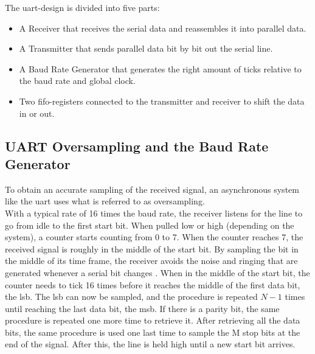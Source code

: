\documentclass[main.tex]{subfiles}
\begin{document}
The \gls{uart}-design is divided into five parts:
\begin{itemize}
\item A Receiver that receives the serial data and reassembles it into parallel data.
\item A Transmitter that sends parallel data bit by bit out the serial line.
\item A Baud Rate Generator that generates the right amount of ticks relative to the baud rate and global clock.
\item Two \gls{fifo}-registers connected to the transmitter and receiver to shift the data in or out.
\end{itemize}

\subsection{UART Oversampling and the Baud Rate Generator}

To obtain an accurate sampling of the received signal, an asynchronous system like the \gls{uart} uses what is referred to as oversampling. \\

With a typical rate of 16 times the baud rate, the receiver listens for the line to go from idle to the first start bit. When pulled low or high (depending on the system), a counter starts counting from 0 to 7. When the counter reaches 7, the received signal is roughly in the middle of the start bit. By sampling the bit in the middle of its time frame, the receiver avoids the noise and ringing that are generated whenever a serial bit changes \cite{rapid08}. When in the middle of the start bit, the counter needs to tick 16 times before it reaches the middle of the first data bit, the \gls{lsb}. The \gls{lsb} can now be sampled, and the procedure is repeated $N - 1$ times until reaching the last data bit, the \acrshort{msb}. If there is a parity bit, the same procedure is repeated one more time to retrieve it. After retrieving all the data bits, the same procedure is used one last time to sample the M stop bits at the end of the signal. After this, the line is held high until a new start bit arrives. 

\end{document}
